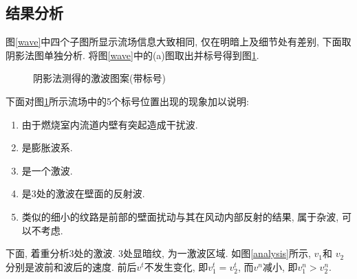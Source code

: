 \documentclass[12pt,a4paper,boxed,titlepage]{caspset}
\begin{document}
\subsection{结果分析}
图\ref{wave}中四个子图所显示流场信息大致相同, 仅在明暗上及细节处有差别, 下面取阴影法图单独分析. 将图\ref{wave}中的(a)图取出并标号得到图\ref{marker}.
\begin{figure}[!htb]
\centering
{}
\caption{\label{marker}阴影法测得的激波图案(带标号)}
\end{figure}
下面对图\ref{marker}所示流场中的5个标号位置出现的现象加以说明:
\begin{enumerate}
\item 由于燃烧室内流道内壁有突起造成干扰波.
\item 是膨胀波系.
\item 是一个激波.
\item 是3处的激波在壁面的反射波.
\item 类似的细小的纹路是前部的壁面扰动与其在风动内部反射的结果, 属于杂波, 可以不考虑.
\end{enumerate}
下面, 着重分析3处的激波. 3处显暗纹, 为一激波区域. 如图\ref{analysis}所示, $v_1$和 $v_2$分别是波前和波后的速度. 前后$v^t$不发生变化, 即$v_1^t = v_2^t$, 而$v^n$减小, 即$v_1^n>v_2^n$.
\end{document}
